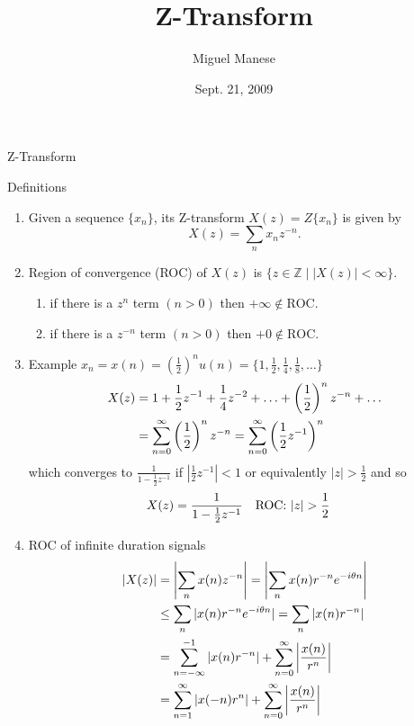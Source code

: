\documentclass{article}
\title{Z-Transform}
\author{Miguel Manese}
\date{Sept. 21, 2009}
\newcommand{\field}[1]{\mathbb{#1}} %
\begin{document}
\maketitle

\begin{section}{Z-Transform}
\begin{subsection}{Definitions}
\begin{enumerate}
\item Given a sequence $\{x_{n}\}$, its Z-transform $X(z) = Z\{x_{n}\}$ is 
given by 
  \[ X(z) = \sum_{n} x_{n} z^{-n}. \]
\item Region of convergence (ROC) of $X(z)$ is $\{z \in \field{Z} \mid |X(z)| < 
\infty \}$.
  \begin{enumerate}
  \item if there is a $z^{n}$ term $(n > 0)$ then $+\infty \not\in \text{ROC}$.
  \item if there is a $z^{-n}$ term $(n > 0)$ then $+0 \not\in \text{ROC}$.
  \end{enumerate}
\item Example $x_{n} = x(n) = (\frac{1}{2})^{n} u(n) = \{1, \frac{1}{2},
 \frac{1}{4}, \frac{1}{8}, \ldots \}$
  \begin{align}
  X(z) &= 1 + \frac{1}{2}z^{-1} + \frac{1}{4}z^{-2} + \ldots +
              \left(\frac{1}{2}\right)^{n} z^{-n} + \ldots \notag\\
       &= \sum_{n=0}^{\infty} \left(\frac{1}{2}\right)^{n} z^{-n} 
        = \sum_{n=0}^{\infty} \left(\frac{1}{2} z^{-1}\right)^{n}\notag 
  \end{align}
  which converges to $\frac{1}{1 - \frac{1}{2}z^{-1}}$ if 
  $|\frac{1}{2} z^{-1}| < 1$ or equivalently $|z| > \frac{1}{2}$ and so
  \begin{align}
  X(z) &= \frac{1}{1 - \frac{1}{2}z^{-1}} && \text{ROC: } |z| > \frac{1}{2}
   \notag
  \end{align}
\item ROC of infinite duration signals
  \begin{align}
  |X(z)| &= \left|\sum_n x(n)z^{-n}\right|
          = \left|\sum_{n} x(n)r^{-n} e^{-i\theta n}\right| \notag\\
         &\leq \sum_{n} |x(n) r^{-n} e^{-i\theta n}| 
           = \sum_{n} |x(n) r^{-n}|\notag\\
         &= \sum_{n= -\infty}^{-1} |x(n) r^{-n}| +
            \sum_{n=0}^{\infty} \left|\frac{x(n)}{r^{n}}\right| \notag\\
         &= \sum_{n=1}^{\infty} |x(-n) r^{n}| +
            \sum_{n=0}^{\infty} \left|\frac{x(n)}{r^{n}}\right|\notag

\end{align}
\end{enumerate}
\end{subsection}
\end{section}
\end{document}
